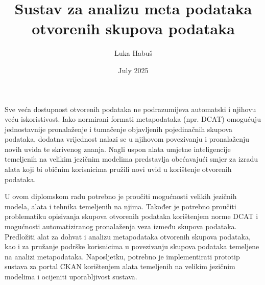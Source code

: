 \documentclass[diplomskirad]{fer}
\title{Sustav za analizu meta podataka otvorenih skupova podataka}
\author{Luka Habuš}
\date{July 2025}
\begin{document}
\maketitle



\begin{zahvale}
\end{zahvale}

\mainmatter

\tableofcontents

\listoffigures











\begin{sazetak}
Sve veća dostupnost otvorenih podataka ne podrazumijeva automatski i njihovu veću iskoristivost. Iako normirani formati metapodataka (npr. DCAT) omogućuju jednostavnije pronalaženje i tumačenje objavljenih pojedinačnih skupova podataka, dodatna vrijednost nalazi se u njihovom povezivanju i pronalaženju novih uvida te skrivenog znanja. Nagli uspon alata umjetne inteligencije temeljenih na velikim jezičnim modelima predstavlja obećavajući smjer za izradu alata koji bi običnim korisnicima pružili novi uvid u korištenje otvorenih podataka.

U ovom diplomskom radu potrebno je proučiti mogućnosti velikih jezičnih modela, alata i tehnika temeljenih na njima. Također je potrebno proučiti problematiku opisivanja skupova otvorenih podataka korištenjem norme DCAT i mogućnosti automatiziranog pronalaženja veza između skupova podataka. Predložiti alat za dohvat i analizu metapodataka otvorenih skupova podataka, kao i za pružanje podrške korisnicima u povezivanju skupova podataka temeljene na analizi metapodataka. Naposljetku, potrebno je implementirati prototip sustava za portal CKAN korištenjem alata temeljenih na velikim jezičnim modelima i ocijeniti uporabljivost sustava.
\end{sazetak}
\end{document}
